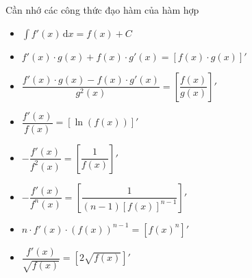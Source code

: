 \begin{tomtat}
	Cần nhớ các công thức đạo hàm của hàm hợp
	\begin{itemize}
		\item $\displaystyle\int f'(x)\mathrm{\,d}x=f(x)+C$
		\item $f'(x)\cdot g(x)+f(x)\cdot g'(x)=\left[f(x)\cdot g(x)\right]'$
		\item $\dfrac{f'(x)\cdot g(x)-f(x)\cdot g'(x)}{g^2(x)}=\left[\dfrac{f(x)}{g(x)}\right]'$
		\item $\dfrac{f'(x)}{f(x)}=\left[\ln \left(f(x)\right)\right]'$
		\item $ -\dfrac{f'(x)}{f^2(x)}=\left[\dfrac 1{f(x)}\right]'$
		\item $-\dfrac{f'(x)}{f^n(x)}=\left[\dfrac 1{(n-1)[f(x)]^{n-1}}\right]'$
		\item $n\cdot f'(x)\cdot \left(f(x)\right)^{n-1}=\left[f(x)^n\right]'$
		\item $\dfrac{f'(x)}{\sqrt{f(x)}}=\left[2\sqrt{f(x)}\right]'$
	\end{itemize}	 
\end{tomtat}
